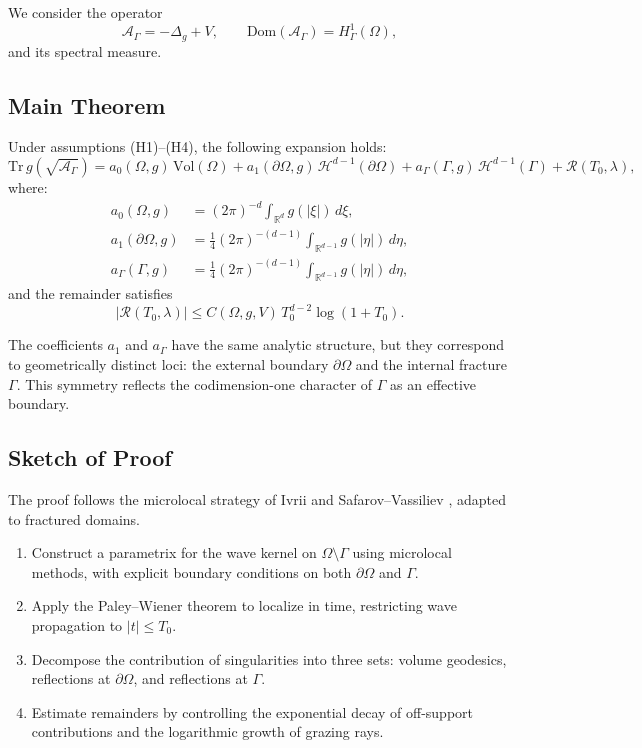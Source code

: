 We consider the operator
\[
\mathcal{A}_\Gamma = -\Delta_g + V, \qquad
\mathrm{Dom}(\mathcal{A}_\Gamma) = H^1_\Gamma(\Omega),
\]
and its spectral measure.

\subsection{Main Theorem}
\begin{theorem}
\label{thm:fracture-trace}
Under assumptions (H1)--(H4), the following expansion holds:
\[
\mathrm{Tr}\, g(\sqrt{\mathcal{A}_\Gamma})
  = a_0(\Omega,g)\,\mathrm{Vol}(\Omega)
   + a_1(\partial\Omega,g)\,\mathcal{H}^{d-1}(\partial\Omega)
   + a_\Gamma(\Gamma,g)\,\mathcal{H}^{d-1}(\Gamma)
   + \mathcal{R}(T_0,\lambda),
\]
where:
\begin{align*}
a_0(\Omega,g) &= (2\pi)^{-d}\int_{\mathbb{R}^d} g(|\xi|)\, d\xi, \\
a_1(\partial\Omega,g) &= \tfrac{1}{4}(2\pi)^{-(d-1)} \int_{\mathbb{R}^{d-1}} g(|\eta|)\, d\eta, \\
a_\Gamma(\Gamma,g) &= \tfrac{1}{4}(2\pi)^{-(d-1)} \int_{\mathbb{R}^{d-1}} g(|\eta|)\, d\eta,
\end{align*}
and the remainder satisfies
\[
|\mathcal{R}(T_0,\lambda)| \leq
C(\Omega,g,V)\, T_0^{d-2}\log(1+T_0).
\]
\end{theorem}

\begin{remark}
The coefficients $a_1$ and $a_\Gamma$ have the same analytic structure,
but they correspond to geometrically distinct loci: the external boundary
$\partial\Omega$ and the internal fracture $\Gamma$. This symmetry reflects
the codimension-one character of $\Gamma$ as an effective boundary.
\end{remark}

\subsection{Sketch of Proof}
The proof follows the microlocal strategy of Ivrii \cite{Ivrii1998} and
Safarov--Vassiliev \cite{SafarovVassiliev1997}, adapted to fractured domains.

\begin{enumerate}[label=(\roman*)]
\item Construct a parametrix for the wave kernel on $\Omega\setminus\Gamma$
using microlocal methods, with explicit boundary conditions on both
$\partial\Omega$ and $\Gamma$.
\item Apply the Paley–Wiener theorem to localize in time, restricting
wave propagation to $|t|\leq T_0$.
\item Decompose the contribution of singularities into three sets:
volume geodesics, reflections at $\partial\Omega$, and reflections at
$\Gamma$.
\item Estimate remainders by controlling the exponential decay of
off-support contributions and the logarithmic growth of grazing rays.
\end{enumerate}

